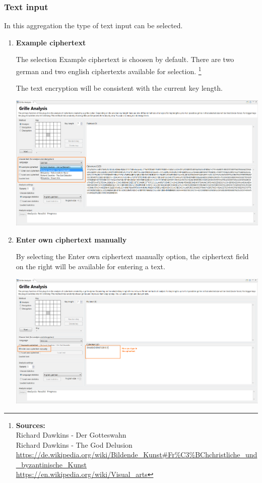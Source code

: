 \documentclass[fontsize=12pt, DIV=15, parskip=half-]{scrartcl}
\theoremstyle{break}
\begin{document}
\subsubsection{Text input}\hypertarget{txteing}{}
In this aggregation the type of text input can be selected. 

\begin{enumerate}[label=(\alph*), leftmargin=*]
\item \textbf{Example ciphertext}

The selection \glqq Example ciphertext\grqq{} is choosen by default. There are two german and two english ciphertexts available for selection. \footnote{\textbf{Sources:}\\ Richard Dawkins - Der Gotteswahn\\ Richard Dawkins - The God Delusion\\ \url{https://de.wikipedia.org/wiki/Bildende_Kunst\#Fr\%C3\%BChchristliche_und_byzantinische_Kunst}\\ \url{https://en.wikipedia.org/wiki/Visual_arts}}

The text encryption will be consistent with the current key length. 

\includegraphics[scale=0.4]{enFleissnerTxtAuswahl.png}
\newpage

\item \textbf{Enter own ciphertext manually}

By selecting the \glqq Enter own ciphertext manually\grqq{} option, the ciphertext field on the right will be available for entering a text.

\includegraphics[scale=0.4]{enFleissnerManGhtxt.png}


\end{enumerate}
\end{document}
